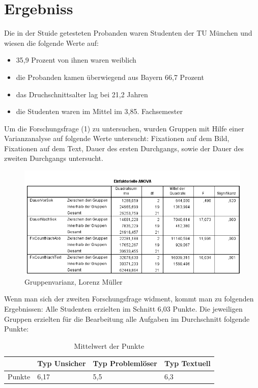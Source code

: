 \chapter{Ergebniss}

Die in der Stuide getesteten Probanden waren Studenten der TU München und wiesen die folgende Werte auf:

    \begin{itemize}
        \item 35,9 Prozent von ihnen waren weiblich 
        \item die Probanden kamen überwiegend aus Bayern 66,7 Prozent
        \item das Druchschnittsalter lag bei 21,2 Jahren 
        \item die Studenten waren im Mittel im 3,85. Fachsemester
    \end{itemize}

 Um die Forschungsfrage (1) zu untersuchen, wurden Gruppen mit Hilfe einer Varianzanalyse auf folgende Werte untersucht: Fixationen auf dem Bild, Fixationen auf dem Text, Dauer des ersten Durchgangs, sowie der Dauer des zweiten Durchgangs untersucht.


\begin{figure}[!ht]
\noindent\hspace{0.5mm}\includegraphics[width=15cm]{./Ressourcen/Gruppenunterscheidung.png}
\caption{Gruppenvarianz, Lorenz Müller}
\end{figure}

Wenn man sich der zweiten Forschungsfrage widment, kommt man zu folgenden Ergebnissen:
Alle Studenten erzielten im Schnitt 6,03 Punkte. 
Die jeweiligen Gruppen erzielten für die Bearbeitung alle Aufgaben im Durchschnitt folgende Punkte:

\begin{table}[!h]
\hspace{-5pt}
\begin{tabularx}{\textwidth + 5pt}{| @{\hspace{3pt}} M || @{\hspace{3pt}} M  | @{\hspace{3pt}} M | @{\hspace{3pt}} M |}
\hline
\textbf{ } & \textbf{Typ Unsicher} & \textbf{Typ Problemlöser} & \textbf{Typ Textuell}\\
\hline
\hline
Punkte        & 6,17 & 5,5 & 6,3\\
\hline
\end{tabularx}
\caption{Mittelwert der Punkte}
\end{table}


